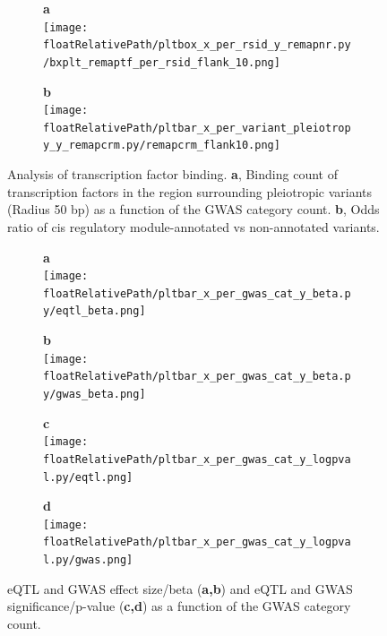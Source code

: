 \begin{figure}[!tbp]
\centering
%
\begin{subfigure}[]{.33\textwidth}
\textbf{a}
\\
\texttt{[image: \\floatRelativePath/pltbox\_x\_per\_rsid\_y\_remapnr.py/bxplt\_remaptf\_per\_rsid\_flank\_10.png]}
\end{subfigure}
%
\begin{subfigure}[]{.33\textwidth}
\textbf{b}
\\
\texttt{[image: \\floatRelativePath/pltbar\_x\_per\_variant\_pleiotropy\_y\_remapcrm.py/remapcrm\_flank10.png]}
\end{subfigure}
%
\caption{Analysis of transcription factor binding. \textbf{a}, Binding count of transcription factors in the region surrounding pleiotropic variants (Radius 50 bp) as a function of the GWAS category count. \textbf{b}, Odds ratio of cis regulatory module-annotated vs non-annotated variants.} \label{fig:freq_tf_per_variant}
%
\end{figure}
%
%
\begin{figure}[!tbp]
\centering
%
\begin{subfigure}[]{.33\textwidth}
\textbf{a}
\\
\texttt{[image: \\floatRelativePath/pltbar\_x\_per\_gwas\_cat\_y\_beta.py/eqtl\_beta.png]}
\end{subfigure}
%
\begin{subfigure}[]{.33\textwidth}
\textbf{b}
\\
\texttt{[image: \\floatRelativePath/pltbar\_x\_per\_gwas\_cat\_y\_beta.py/gwas\_beta.png]}
\end{subfigure}

\begin{subfigure}[]{.33\textwidth}
\textbf{c}
\\
\texttt{[image: \\floatRelativePath/pltbar\_x\_per\_gwas\_cat\_y\_logpval.py/eqtl.png]}
\end{subfigure}
%
\begin{subfigure}[]{.33\textwidth}
\textbf{d}
\\
\texttt{[image: \\floatRelativePath/pltbar\_x\_per\_gwas\_cat\_y\_logpval.py/gwas.png]}
\end{subfigure}

\caption{eQTL and GWAS effect size/beta (\textbf{a,b}) and eQTL and GWAS significance/p-value (\textbf{c,d}) as a function of the GWAS category count.} \label{fig:beta_pval}
%
\end{figure}
